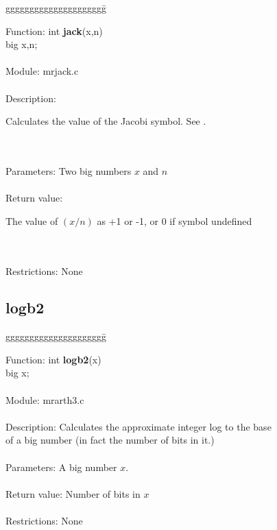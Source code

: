 \begin{tabbing}
ggggggggggggggggggggg\= \kill

      Function:      \>int {\bf jack}(x,n) \\
                     \>big x,n; \\
      \ \\
      Module:        \>mrjack.c \\
      \ \\
      Description:   \>
                     \parbox[t]{3in}
                     {Calculates the value of the Jacobi symbol. 
                      See \cite{Reisel}. }\\
      \ \\
      Parameters:    \>Two big numbers $x$ and $n$ \\
      \ \\
      Return value:  \>
                     \parbox[t]{3in}
                     {The value of $(x/n)$ as +1 or -1, or 0 if symbol 
                      undefined} \\
      \ \\
      Restrictions:  \>None \\

\end{tabbing}
\subsection{logb2}

\begin{tabbing}
ggggggggggggggggggggg\= \kill

      Function:      \>int {\bf logb2}(x) \\
                     \>big x; \\
      \ \\
      Module:        \>mrarth3.c \\
      \ \\
      Description:   \>Calculates the approximate integer log to the base \\
                      of a big number (in fact the number of bits in it.) \\
      \ \\
      Parameters:    \>A big number $x$. \\
      \ \\
      Return value:  \>Number of bits in $x$ \\
      \ \\
      Restrictions:  \>None \\

\end{tabbing}
\pagebreak
